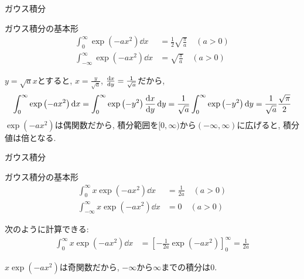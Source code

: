 \documentclass[dvipdfmx,notheorems,t]{beamer}
\begin{document}
\begin{frame}{ガウス積分}
\begin{block}{ガウス積分の基本形}
  \begin{align*}
    \int_0^\infty \exp \left( -a x^2 \right) \dd{x} &= \frac{1}{2} \sqrt{\frac{\pi}{a}}
      \quad (a > 0) \\
    \int_{-\infty}^\infty \exp \left( -a x^2 \right) \dd{x} &= \sqrt{\frac{\pi}{a}}
      \quad (a > 0)
  \end{align*}
\end{block}

$y = \sqrt{a} x$とすると, $x = \frac{y}{\sqrt{a}}$, $\dv{x}{y} = \frac{1}{\sqrt{a}}$だから,
{\small \begin{align*}
  \int_0^\infty \exp \left( -a x^2 \right) \dd{x}
    = \int_0^\infty \exp \left( -y^2 \right) \dv{x}{y} \dd{y}
    = \frac{1}{\sqrt{a}} \int_0^\infty \exp \left( -y^2 \right) \dd{y}
    = \frac{1}{\sqrt{a}} \frac{\sqrt{\pi}}{2}
\end{align*}}
$\exp \left( -a x^2 \right)$は偶関数だから, 積分範囲を$[0, \infty)$から$(-\infty, \infty)$に広げると, 積分値は倍となる.
\end{frame}

\begin{frame}{ガウス積分}
\begin{block}{ガウス積分の基本形}
  \begin{align*}
    \int_0^\infty x \exp \left( -a x^2 \right) \dd{x} &= \frac{1}{2a} \quad (a > 0) \\
    \int_{-\infty}^\infty x \exp \left( -a x^2 \right) \dd{x} &= 0 \quad (a > 0)
  \end{align*}
\end{block}

次のように計算できる:
\begin{align*}
  \int_0^\infty x \exp \left( -a x^2 \right) \dd{x}
    &= \left[ -\frac{1}{2a} \exp \left( -a x^2 \right) \right]_0^\infty = \frac{1}{2a}
\end{align*}

$x \exp \left( -a x^2 \right)$は奇関数だから, $-\infty$から$\infty$までの積分は$0$.
\end{frame}
\end{document}
